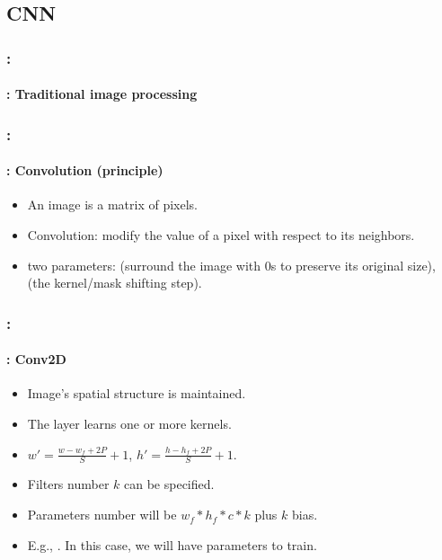 \documentclass[xcolor=table]{beamer}
\begin{document}
\subsection{CNN}

\begin{frame}
	\frametitle{\insertshortsubtitle: \insertsection}
	\framesubtitle{\insertsubsection: Traditional image processing}
	
	\begin{center}
	\end{center}
	
\end{frame}

\begin{frame}
	\frametitle{\insertshortsubtitle: \insertsection}
	\framesubtitle{\insertsubsection: Convolution (principle)}
	
	\begin{itemize}
		\item An image is a matrix of pixels.
		\item Convolution: modify the value of a pixel with respect to its neighbors.
		\item two parameters:  (surround the image with 0s to preserve its original size),  (the kernel/mask shifting step).
	\end{itemize}
	
	\begin{center}
	\end{center}
	
\end{frame}

\begin{frame}
	\frametitle{\insertshortsubtitle: \insertsection}
	\framesubtitle{\insertsubsection: Conv2D}
	
	\begin{minipage}{0.60\textwidth} 
		\begin{itemize}
			\item Image's spatial structure is maintained.
			\item The layer learns one or more kernels.
			\item $ w' = \frac{w - w_f + 2P}{S} + 1$,  $ h' = \frac{h - h_f + 2P}{S} + 1$.
			\item Filters number $k$ can be specified.
			\item Parameters number will be $w_f * h_f * c * k$ plus $k$ bias.
			\item E.g., . In this case, we will have  parameters to train.
		\end{itemize}
	\end{minipage}
	\begin{minipage}{0.39\textwidth}
	\end{minipage}
	
\end{frame}
\end{document}
